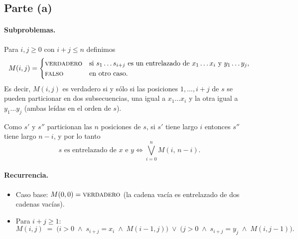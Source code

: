 
\subsection*{Parte (a)}

\paragraph{Subproblemas.} Para $i,j \ge 0$ con $i+j\le n$ definimos
\[
M(i,j) = \begin{cases}
\textsc{verdadero} & \text{si } s_1\dots s_{i+j} \text{ es un entrelazado de } x_1\dots x_i \text{ y } y_1\dots y_j,\\
\textsc{falso} & \text{en otro caso.}
\end{cases}
\]
Es decir, $M(i,j)$ es verdadero si y sólo si las posiciones $1,\dots,i+j$ de $s$ se pueden particionar en
dos subsecuencias, una igual a $x_1\dots x_i$ y la otra igual a $y_1\dots y_j$ (ambas leídas en el orden de
$s$).

Como $s'$ y $s''$ particionan las $n$ posiciones de $s$, si $s'$ tiene largo $i$ entonces $s''$ tiene largo
$n-i$, y por lo tanto
\[
s \text{ es entrelazado de } x \text{ e } y \iff \bigvee_{i=0}^{n} M(i,\,n-i).
\]

\paragraph{Recurrencia.}
\begin{itemize}
\item Caso base: $M(0,0)=\textsc{verdadero}$ (la cadena vacía es entrelazado de dos cadenas vacías).
\item Para $i+j\ge 1$:
\[
M(i,j) \;=\; \bigl(i>0 \;\wedge\; s_{i+j}=x_i \;\wedge\; M(i-1,j)\bigr)
\;\vee\;
\bigl(j>0 \;\wedge\; s_{i+j}=y_j \;\wedge\; M(i,j-1)\bigr).
\]
\end{itemize}

